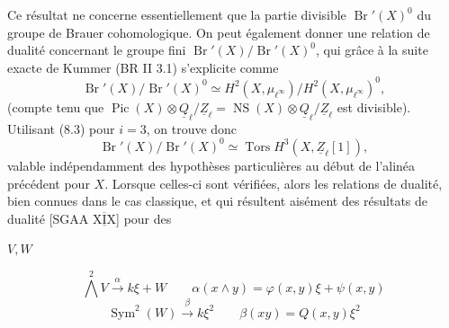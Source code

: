  Ce résultat ne concerne essentiellement que la partie divisible $\operatorname{Br}'(X)^0$ du groupe de Brauer cohomologique. On peut également donner une relation de dualité concernant le  groupe fini $\operatorname{Br}'(X)/\operatorname{Br}'(X)^0$, qui grâce à la suite exacte de Kummer (BR II 3.1) s'explicite comme
\[
\tag{8.8}\operatorname{Br}'(X)/\operatorname{Br}'(X)^0\simeq H^2(X,\mu_{\ell^\infty})/H^2(X,\mu_{\ell^\infty})^0,
\]
(compte tenu que $\operatorname{Pic}(X)\otimes\underline Q_{\ell}/\underline Z_{\ell}=\operatorname{NS}(X)\otimes\underline Q_{\ell}/\underline Z_{\ell}$ est divisible). Utilisant (8.3) pour $i=3$, on trouve donc
\[
\tag{8.9}\operatorname{Br}'(X)/\operatorname{Br}'(X)^0\simeq\operatorname{Tors}H^3(X,\underline Z_{\ell}[1]),
\]
\inserted{(}valable indépendamment des hypothèses particulières   au début de l'alinéa précédent pour $X$. Lorsque celles-ci sont vérifiées, alors les relations de dualité, bien connues dans le cas classique, et qui résultent aisément  des résultats de dualité [SGAA $\overline{\underline{\mathrm{XIX}}}$\quad] pour des
\margin{$\times$}

\begin{flushright}\end{flushright}

$V,W$

\[
\bigwedge^2 V\xrightarrow{\alpha}k\xi+W
\qquad \alpha(x\wedge y)=\varphi(x,y)\xi+\psi(x,y)
\]
\[
\operatorname{Sym}^2(W)\xrightarrow{\beta}k\xi^2
\qquad \beta(xy)=Q(x,y)\xi^2
\]


